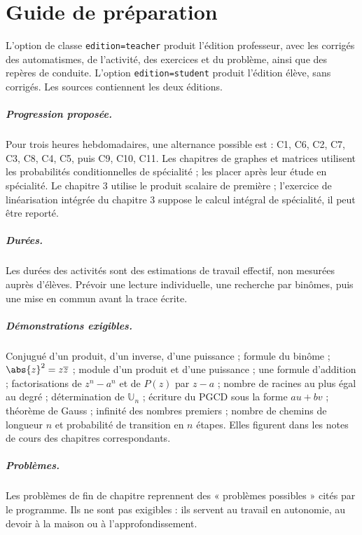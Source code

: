 \chapter*{Guide de préparation}
\begin{teachernote}
L'option de classe \texttt{edition=teacher} produit l'édition professeur, avec les corrigés des automatismes, de l'activité, des exercices et du problème, ainsi que des repères de conduite. L'option \texttt{edition=student} produit l'édition élève, sans corrigés. Les sources contiennent les deux éditions.
\end{teachernote}
\paragraph{Progression proposée.} Pour trois heures hebdomadaires, une alternance possible est : C1, C6, C2, C7, C3, C8, C4, C5, puis C9, C10, C11. Les chapitres de graphes et matrices utilisent les probabilités conditionnelles de spécialité ; les placer après leur étude en spécialité. Le chapitre 3 utilise le produit scalaire de première ; l'exercice de linéarisation intégrée du chapitre 3 suppose le calcul intégral de spécialité, il peut être reporté.
\paragraph{Durées.} Les durées des activités sont des estimations de travail effectif, non mesurées auprès d'élèves. Prévoir une lecture individuelle, une recherche par binômes, puis une mise en commun avant la trace écrite.
\paragraph{Démonstrations exigibles.} Conjugué d'un produit, d'un inverse, d'une puissance ; formule du binôme ; $\abs{z}^2=z\overline{z}$ ; module d'un produit et d'une puissance ; une formule d'addition ; factorisations de $z^n-a^n$ et de $P(z)$ par $z-a$ ; nombre de racines au plus égal au degré ; détermination de $\mathbb{U}_n$ ; écriture du PGCD sous la forme $au+bv$ ; théorème de Gauss ; infinité des nombres premiers ; nombre de chemins de longueur $n$ et probabilité de transition en $n$ étapes. Elles figurent dans les notes de cours des chapitres correspondants.
\paragraph{Problèmes.} Les problèmes de fin de chapitre reprennent des « problèmes possibles » cités par le programme. Ils ne sont pas exigibles : ils servent au travail en autonomie, au devoir à la maison ou à l'approfondissement.
\fi
\tableofcontents
\mainmatter
